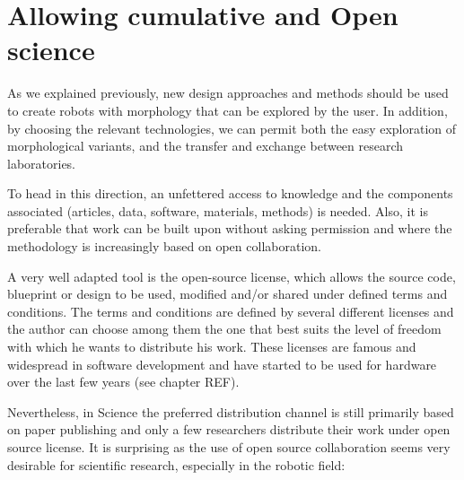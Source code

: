 \section{Allowing cumulative and Open science} %

As we explained previously, new design approaches and methods should be used to create robots with morphology that can be explored by the user. In addition, by choosing the relevant technologies, we can permit both  the easy exploration of morphological variants, and the transfer and exchange between research laboratories.

To head in this direction, an unfettered access to knowledge and the components associated (articles, data, software, materials, methods) is needed. Also, it is preferable that work can be built upon without asking permission and where the methodology is increasingly based on open collaboration.

A very well adapted tool is the open-source license, which allows the source code, blueprint or design to be used, modified and/or shared under defined terms and conditions. The terms and conditions are defined by several different licenses and the author can choose among them the one that best suits the level of freedom  with which he wants to distribute his work. These licenses are famous and widespread in software development and have started to be used for hardware over the last  few years (see chapter REF).

Nevertheless, in Science the preferred distribution channel is still primarily based on paper publishing and only a few researchers distribute their work under open source license. It is surprising as the use of open source collaboration seems very desirable for scientific research, especially in the robotic field:

